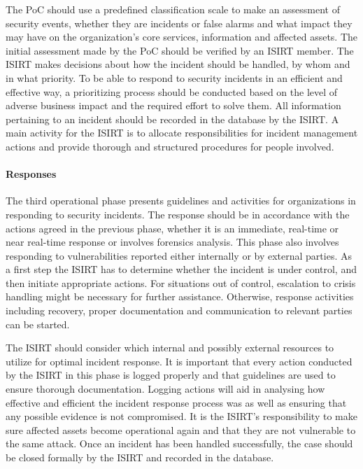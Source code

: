 The PoC should use a predefined classification scale to make an assessment of security events, whether they are incidents or false alarms and what impact they may have on the organization's core services, information and affected assets. The initial assessment made by the PoC should be verified by an \ac{ISIRT} member. The \ac{ISIRT} makes decisions about how the incident should be handled, by whom and in what priority. To be able to respond to security incidents in an efficient and effective way, a prioritizing process should be conducted based on the level of adverse business impact and the required effort to solve them.  All information pertaining to an incident should be recorded in the database by the \ac{ISIRT}. A main activity for the \ac{ISIRT} is to allocate responsibilities for incident management actions and provide thorough and structured procedures for people involved. 

\paragraph{Responses} The third operational phase presents guidelines and activities for organizations in responding to security incidents. The response should be in accordance with the actions agreed in the previous phase, whether it is an immediate, real-time or near real-time response or involves forensics analysis. This phase also involves responding to vulnerabilities reported either internally or by external parties. As a first step the \ac{ISIRT} has to determine whether the incident is under control, and then initiate appropriate actions. For situations out of control, escalation to crisis handling might be necessary for further assistance. Otherwise, response activities including recovery, proper documentation and communication to relevant parties can be started. 

The \ac{ISIRT} should consider which internal and possibly external resources to utilize for optimal incident response. It is important that every action conducted by the \ac{ISIRT} in this phase is logged properly and that guidelines are used to ensure thorough documentation. Logging actions will aid in analysing how effective and efficient the incident response process was as well as ensuring that any possible evidence is not compromised. It is the \ac{ISIRT}'s responsibility to make sure affected assets become operational again and that they are not vulnerable to the same attack. Once an incident has been handled successfully, the case should be closed formally by the \ac{ISIRT} and recorded in the database.

